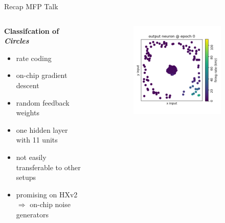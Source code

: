 \documentclass[12pt, aspectratio=169]{beamer}
\begin{document}
\begin{frame}{Recap MFP Talk}
\begin{columns}[t]
	\begin{column}{0.5\textwidth}
		\textbf{Classifcation of \emph{Circles}}
		\begin{itemize}
			\item rate coding
			\item on-chip gradient descent
			\item random feedback weights
			\item one hidden layer with 11 units
			\item not easily transferable to other setups
			\item promising on HXv2\\
			$\Rightarrow$ on-chip noise generators
		\end{itemize}
	\end{column}
	\begin{column}{0.5\textwidth}
		\begin{figure}
			\vspace{-1cm}
			\begin{subfigure}{0.3\textwidth}
				\centering
				\includegraphics[scale=0.20]{mfp/learning_process/output_neuron_5.png}
				\label{cubesetup}
			\end{subfigure}
			\begin{subfigure}{0.3\textwidth}
				\centering

\end{subfigure}
\end{figure}
\end{column}
\end{columns}
\end{frame}
\end{document}
